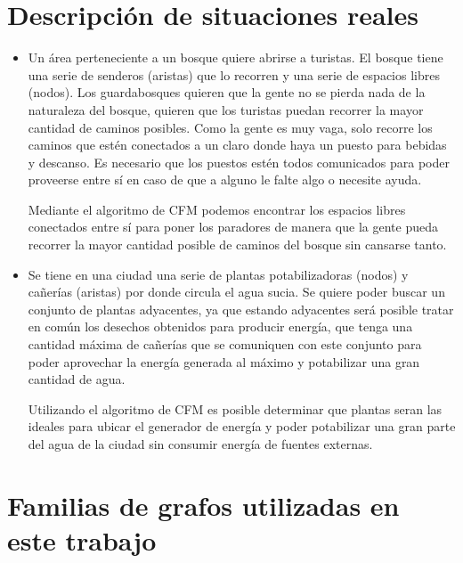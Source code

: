\documentclass[a4paper, 10pt, twoside]{article}
\begin{document}
\section{Descripción de situaciones reales}
\begin{itemize}
\item Un área perteneciente a un bosque quiere abrirse a turistas. El bosque tiene una serie de senderos (aristas) que lo recorren y una serie de espacios libres (nodos). Los guardabosques quieren que la gente no se pierda nada de la naturaleza del bosque, quieren que los turistas puedan recorrer la mayor cantidad de caminos posibles. Como la gente es muy vaga, solo recorre los caminos que estén conectados a un claro donde haya un puesto para bebidas y descanso. Es necesario que los puestos estén todos comunicados para poder proveerse entre sí en caso de que a alguno le falte algo o necesite ayuda. 

Mediante el algoritmo de CFM podemos encontrar los espacios libres conectados entre sí para poner los paradores de manera que la gente pueda recorrer la mayor cantidad posible de caminos del bosque sin cansarse tanto.

\item Se tiene en una ciudad una serie de plantas potabilizadoras (nodos) y cañerías (aristas) por donde circula el agua sucia. Se quiere poder buscar un conjunto de plantas adyacentes, ya que estando adyacentes será posible tratar en común los desechos obtenidos para producir energía, que tenga una cantidad máxima de cañerías que se comuniquen con este conjunto para poder aprovechar la energía generada al máximo y potabilizar una gran cantidad de agua.

Utilizando el algoritmo de CFM es posible determinar que plantas seran las ideales para ubicar el generador de energía y poder potabilizar una gran parte del agua de la ciudad sin consumir energía de fuentes externas.
\end{itemize}




\newpage
\section{Familias de grafos utilizadas en este trabajo}

\end{document}
